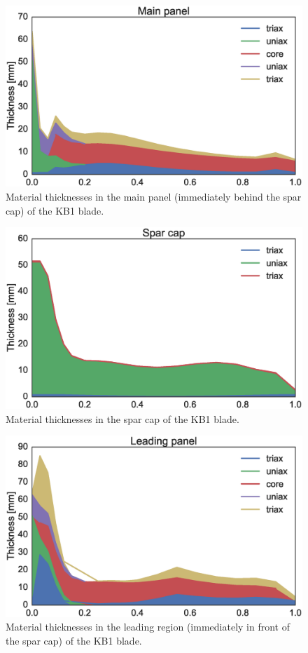 \begin{figure}[!ht]
\begin{center}
	\includegraphics[width=.85\linewidth]{figures/KB1_region02.eps}
\end{center}
\caption{Material thicknesses in the main panel (immediately behind the spar cap) of the KB1 blade.}
\label{fig:matstackr02}
\end{figure}

\begin{figure}[!ht]
\begin{center}
	\includegraphics[width=.85\linewidth]{figures/KB1_region04.eps}
\end{center}
\caption{Material thicknesses in the spar cap of the KB1 blade.}
\label{fig:matstackr04}
\end{figure}

\begin{figure}[!ht]
\begin{center}
	\includegraphics[width=.85\linewidth]{figures/KB1_region06.eps}
\end{center}
\caption{Material thicknesses in the leading region (immediately in front of the spar cap) of the KB1 blade.}
\label{fig:matstackr06}
\end{figure}

